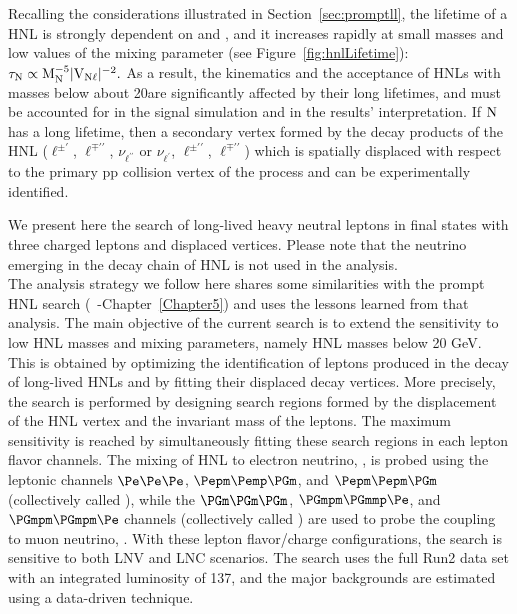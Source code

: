 Recalling the considerations illustrated in Section~\ref{sec:promptll}, the lifetime of a HNL is strongly dependent on \mhnl and \mixpar,
and it increases rapidly at small masses and low values of the mixing
parameter (see Figure~\ref{fig:hnlLifetime}):
\(\tau_\mathrm{N}\propto\mathrm{M_{\mathrm{N}}^{-5}|V_{\mathrm{N}\ell}|^{-2}}.\)
As a result, the kinematics and the acceptance of HNLs with masses
below about 20\GeV are significantly affected by their long lifetimes,
and must be accounted for in the signal simulation and in the results'
interpretation.
If $\mathrm{N}$ has a long lifetime, then a secondary vertex formed by the decay products of the HNL ($\ell^{\pm\prime}$, $\ell^{\mp\prime\prime}$, $\nu_{\ell^{\prime\prime}}$ or
$\nu_{\ell^{\prime}}$, $\ell^{\pm\prime\prime}$,
$\ell^{\mp\prime\prime}$) which is spatially displaced with respect to
the primary pp collision vertex of the process and can be experimentally identified. 

We present here the search of long-lived heavy neutral leptons in final states
with three charged leptons and displaced vertices. Please note that
the neutrino emerging in the decay chain of HNL is not used in the analysis.\\
The analysis strategy we follow here shares some similarities with the
prompt HNL search (~\cite{Sirunyan:2018mtv}-Chapter~\ref{Chapter5})
and uses the lessons learned from that
analysis. 
The main objective of the current search is to extend the
sensitivity to low HNL masses and mixing parameters, namely HNL masses
below 20 GeV. This is obtained by optimizing the identification
of leptons produced in the decay of long-lived HNLs and by fitting
their displaced decay vertices. More precisely, the search is
performed by designing search regions formed by the displacement of
the HNL vertex and the invariant mass of the \displ leptons. The
maximum sensitivity is reached by simultaneously fitting these search
regions in each lepton flavor channels. The mixing of HNL to electron
neutrino, \mixpare, is probed using the leptonic channels 
$\Pe\Pe\Pe$, $\Pepm\Pemp\PGm$, and $\Pepm\Pepm\PGm$ (collectively
called \eex),
while the $\PGm\PGm\PGm$,  $\PGmpm\PGmmp\Pe$, and $\PGmpm\PGmpm\Pe$
channels (collectively called \mmx) are used to probe the coupling to
muon neutrino, \mixparm.
With these lepton flavor/charge configurations, the search is
sensitive to both LNV and LNC scenarios.
The search uses the full Run2 data set with an integrated luminosity
of 137\fbinv, and the major backgrounds are estimated using a
data-driven technique.

